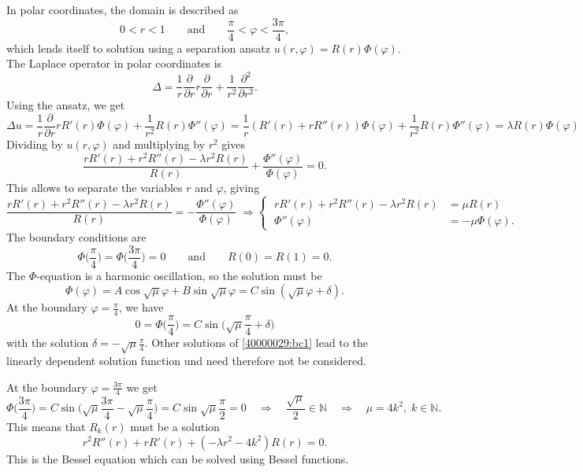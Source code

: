 \begin{loesung}
In polar coordinates, the domain is described as
\[
0< r < 1
\qquad\text{and}\qquad
\frac{\pi}4 < \varphi < \frac{3\pi}{4},
\]
which lends itself to solution using a separation ansatz
$u(r,\varphi) = R(r)\Phi(\varphi)$.
The Laplace operator in polar coordinates is
\[
\Delta
=
\frac1r \frac{\partial}{\partial r}r\frac{\partial }{\partial r}
+
\frac1{r^2}\frac{\partial^2}{\partial r^2}.
\]
Using the ansatz, we get
\[
\Delta u
=
\frac{1}{r}\frac{\partial}{\partial r} rR'(r)\Phi(\varphi)
+
\frac{1}{r^2}R(r)\Phi''(\varphi)
=
\frac{1}{r}(R'(r)+rR''(r))\Phi(\varphi)
+
\frac{1}{r^2}R(r)\Phi''(\varphi)
=
\lambda R(r)\Phi(\varphi)
\]
Dividing by $u(r,\varphi)$ and multiplying by $r^2$ gives
\[
\frac{rR'(r)+r^2R''(r)-\lambda r^2R(r)}{R(r)}
+
\frac{\Phi''(\varphi)}{\Phi(\varphi)}
=
0.
\]
This allows to separate the variables $r$ and $\varphi$, giving
\[
\frac{rR'(r)+r^2R''(r)-\lambda r^2R(r)}{R(r)}
=-
\frac{\Phi''(\varphi)}{\Phi(\varphi)}
\;\Rightarrow
\left\{
\;
\begin{aligned}
rR'(r)+r^2R''(r)-\lambda r^2R(r) &= \mu R(r) \\
\Phi''(\varphi) &= -\mu \Phi(\varphi).
\end{aligned}
\right.
\]
The boundary conditions are
\begin{equation}
\Phi\biggl(\frac{\pi}4\biggr)=\Phi\biggl(\frac{3\pi}4\biggr)=0 
\qquad\text{and}\qquad
   R(0)=R(1)= 0.
\end{equation}
The $\Phi$-equation is a harmonic oscillation, so the solution must be
\[
\Phi(\varphi)
=
A \cos\sqrt{\mu}\varphi + B \sin\sqrt{\mu}\varphi
=
C\sin(\sqrt{\mu}\varphi + \delta).
\]
At the boundary $\varphi=\frac{\pi}4$, we have
\begin{equation}
0
=
\Phi\biggl(\frac{\pi}4\biggr)
=
C\sin\biggl(\sqrt{\mu}\frac{\pi}4+\delta\biggr)
\label{40000029:bc1}
\end{equation}
with the solution $\delta=-\sqrt{\mu}\frac{\pi}4$.
Other solutions of \eqref{40000029:bc1} lead to the linearly
dependent solution function und need therefore not be considered.

At the boundary $\varphi=\frac{3\pi}4$ we get
\[
\Phi\biggl(\frac{3\pi}4\biggr)
=
C\sin\biggl(\sqrt{\mu}\frac{3\pi}4-\sqrt{\mu}\frac{\pi}4\biggr)
=
C\sin\sqrt{\mu}\frac{\pi}{2}
=
0
\quad\Rightarrow\quad
\frac{\sqrt{\mu}}2 \in \mathbb{N}
\quad\Rightarrow\quad
\mu = 4k^2,\;k\in\mathbb{N}.
\]
This means that $R_k(r)$  must be a solution
\begin{equation}
r^2R''(r) + rR'(r) +(-\lambda r^2-4k^2) R(r) = 0.
\label{40000029:bessel}
\end{equation}
This is the Bessel equation which can be solved using Bessel functions.
\end{loesung}


